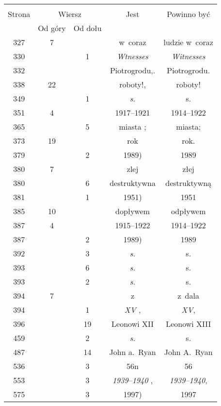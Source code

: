 \documentclass[a4paper,11pt]{article}
\begin{document}
\begin{center}
  \begin{tabular}{|c|c|c|c|c|}
    \hline
    & \multicolumn{2}{c|}{} & & \\
    Strona & \multicolumn{2}{c|}{Wiersz}& Jest & Powinno być \\ \cline{2-3}
    & Od góry & Od dołu &  &  \\ \hline
    327 & 7 & & w~coraz & ludzie w~coraz \\
    330 & & 1 & \emph{Wtnesses} & \emph{Witnesses} \\
    332 & & & Piotrogrodu,. & Piotrogrodu. \\
    338 & 22 & & roboty!, & roboty! \\
    349 & & 1 & \emph{s.} & s. \\
    351 & 4 & & 1917--1921 & 1914--1922 \\
    365 & & 5 & miasta ; & miasta; \\
    373 & 19 & & rok & rok. \\
    379 & & 2 & 1989) & 1989 \\
    380 & 7 & & zlej & złej \\
    380 & & 6 & destruktywna & destruktywną \\
    381 & & 1 & 1951) & 1951 \\
    385 & 10 & & dopływem & odpływem \\
    387 & 4 & & 1915--1922 & 1914--1922 \\
    387 & & 2 & 1989) & 1989 \\
    392 & & 3 & \emph{s.} & s. \\
    393 & & 6 & \emph{s.} & s. \\
    393 & & 2 & \emph{s.} & s. \\
    394 & 7 & & z & z~dala \\
    394 & &  1 & \emph{XV} , & \emph{XV}, \\
    396 & & 19 & Leonowi XII & Leonowi XIII \\
    459 & &  2 & \emph{s.} & s. \\
    487 & & 14 & John a.~Ryan & John A.~Ryan \\
    536 & & 3 & 56n & 56 \\
    553 & & 3 & \emph{1939--1940} , & \emph{1939--1940}, \\
    575 & & 3 & 1997) & 1997 \\
    \hline
  \end{tabular}


\end{center}
\end{document}

